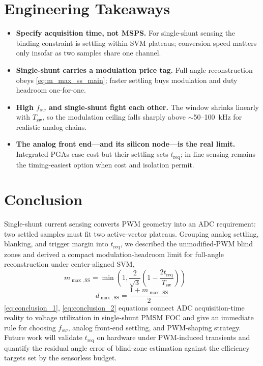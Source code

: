\documentclass[conference]{IEEEtran}
\newcommand{\Tsw}{T_{\mathrm{sw}}}
\newcommand{\treq}{t_{\mathrm{req}}}
\newcommand{\midx}{m}
\newcommand{\dc}{d}
\begin{document}
\section{Engineering Takeaways}
\begin{itemize}
\item \textbf{Specify acquisition time, not MSPS.} For single-shunt sensing the binding constraint is settling within SVM plateaus; conversion speed matters only insofar as two samples share one channel.
\item \textbf{Single-shunt carries a modulation price tag.} Full-angle reconstruction obeys \eqref{eq:m_max_ss_main}; faster settling buys modulation and duty headroom one-for-one.
\item \textbf{High $f_{sw}$ and single-shunt fight each other.} The window shrinks linearly with $\Tsw$, so the modulation ceiling falls sharply above $\sim$50--100~kHz for realistic analog chains.
\item \textbf{The analog front end---and its silicon node---is the real limit.} Integrated PGAs ease cost but their settling sets $\treq$; in-line sensing remains the timing-easiest option when cost and isolation permit.
\end{itemize}

\section{Conclusion}
Single-shunt current sensing converts PWM geometry into an ADC requirement: two settled samples must fit two active-vector plateaus. Grouping analog settling, blanking, and trigger margin into $\treq$, we described the unmodified-PWM blind zones and derived a compact modulation-headroom limit for full-angle reconstruction under center-aligned SVM,
\begin{equation}
\midx_{\max,\mathrm{SS}}=\min\!\left(1,\frac{2}{\sqrt{3}}\left(1-\frac{2\treq}{\Tsw}\right)\right)
\qquad
\label{eq:conclusion_1}
\end{equation}
\begin{equation}
\dc_{\max,\mathrm{SS}}=\frac{1+\midx_{\max,\mathrm{SS}}}{2}
\label{eq:conclusion_2}
\end{equation}
\eqref{eq:conclusion_1}, \eqref{eq:conclusion_2} equations connect ADC acquisition-time reality to voltage utilization in single-shunt PMSM FOC and give an immediate rule for choosing $f_{sw}$, analog front-end settling, and PWM-shaping strategy. Future work will validate $\treq$ on hardware under PWM-induced transients and quantify the residual angle error of blind-zone estimation against the efficiency targets set by the sensorless budget.



\end{document}
